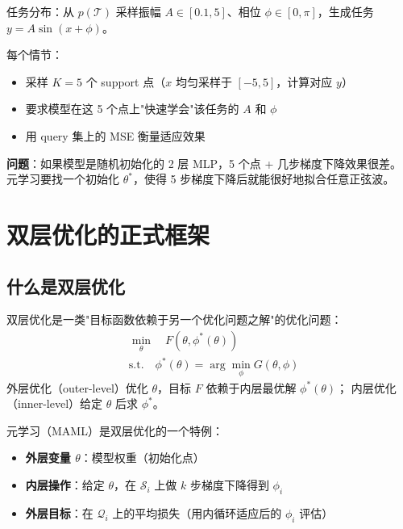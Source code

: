 \begin{toybox}[title=玩具示例：正弦波族 Meta-Learning]
任务分布：从 $p(\mathcal{T})$ 采样振幅 $A \in [0.1, 5]$、相位 $\phi \in [0, \pi]$，生成任务 $y = A\sin(x + \phi)$。

每个情节：
\begin{itemize}
  \item 采样 $K=5$ 个 support 点（$x$ 均匀采样于 $[-5, 5]$，计算对应 $y$）
  \item 要求模型在这 5 个点上"快速学会"该任务的 $A$ 和 $\phi$
  \item 用 query 集上的 MSE 衡量适应效果
\end{itemize}

\textbf{问题}：如果模型是随机初始化的 2 层 MLP，5 个点 + 几步梯度下降效果很差。
元学习要找一个初始化 $\theta^*$，使得 5 步梯度下降后就能很好地拟合任意正弦波。
\end{toybox}

\section{双层优化的正式框架}
\label{sec:bilevel_formal}

\subsection*{什么是双层优化}

\begin{definition}
\label{def:bilevel}
双层优化是一类"目标函数依赖于另一个优化问题之解"的优化问题：
\begin{align}
  &\min_\theta \quad F(\theta, \phi^*(\theta)) \label{eq:bilevel_outer} \\
  &\text{s.t.} \quad \phi^*(\theta) = \arg\min_\phi G(\theta, \phi) \label{eq:bilevel_inner}
\end{align}
外层优化（outer-level）优化 $\theta$，目标 $F$ 依赖于内层最优解 $\phi^*(\theta)$；
内层优化（inner-level）给定 $\theta$ 后求 $\phi^*$。
\end{definition}

元学习（MAML）是双层优化的一个特例：

\begin{itemize}
  \item \textbf{外层变量 $\theta$}：模型权重（初始化点）
  \item \textbf{内层操作}：给定 $\theta$，在 $\mathcal{S}_i$ 上做 $k$ 步梯度下降得到 $\phi_i$
  \item \textbf{外层目标}：在 $\mathcal{Q}_i$ 上的平均损失（用内循环适应后的 $\phi_i$ 评估）
\end{itemize}

